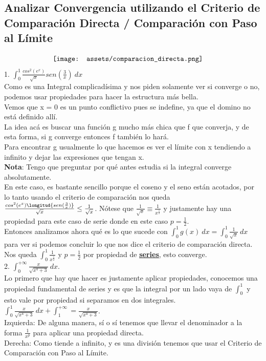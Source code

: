 \documentclass[10pt,a4paper]{article}
\begin{document}
\subsection*{Analizar Convergencia utilizando el Criterio de Comparación Directa / Comparación con Paso al Límite}
\[\begin{minipage}[b]{0.65\textwidth}
    \texttt{[image: assets/comparacion\_directa.png]}
\end{minipage}\]
1. $\int^{1}_{0} \frac{cos^{2}(e^{x})}{\sqrt{x}} sen(\frac{3}{x}) \ dx$ \\
Como es una Integral complicadísima y nos piden solamente ver si converge o no, podemos usar propiedades para hacer la estructura más bella. \\
Vemos que x = 0 es un punto conflictivo pues se indefine, ya que el domino no está definido allí. \\
La idea acá es buscar una función g mucho más chica que f que converja, y de esta forma, si g converge entonces f también lo hará. \\
Para encontrar g usualmente lo que hacemos es ver el límite con x tendiendo a infinito y dejar las expresiones que tengan x. \\
\textbf{Nota}: Tengo que preguntar por qué antes estudia si la integral converge absolutamente. \\
En este caso, es bastante sencillo porque el coseno y el seno están acotados, por lo tanto usando el criterio de comparación nos queda $\frac{cos^{2}(e^{x})\longitud{sen(\frac{3}{x})}}{\sqrt{x}} \le \frac{1}{\sqrt{x}}$. Nótese que $\frac{1}{\sqrt{x}} \equiv \frac{1}{x^{\frac{1}{2}}}$ y justamente hay una propiedad para este caso de serie donde en este caso $p = \frac{1}{2}$. \\
Entonces analizamos ahora qué es lo que sucede con $\int^{1}_{0} g(x) \ dx = \int^{1}_{0} \frac{1}{\sqrt{x}} \ dx$ para ver si podemos concluir lo que nos dice el criterio de comparación directa. \\
Nos queda $\int^{1}_{0} \frac{1}{x^{\frac{1}{2}}}$ y $p = \frac{1}{2}$ por propiedad de \hyperref[subsubsection:series_convergencia]{\textbf{\underline{series}}}, esto converge.  \\
2. $\int^{+ \infty}_{0} \frac{x}{\sqrt{x^{4}+3}} \ dx $. \\
Lo primero que hay que hacer es justamente aplicar propiedades, conocemos una propiedad fundamental de series y es que la integral por un lado vaya de $\int^{1}_{0}$ y esto vale por propiedad si separamos en dos integrales. \\
$\int^{1}_{0} \frac{x}{\sqrt{x^{4}+3}} \ dx + \int^{+\infty}_{1} = \frac{x}{\sqrt{x^{4}+3}}$. \\
Izquierda: De alguna manera, sí o sí tenemos que llevar el denominador a la forma $\frac{1}{x^{p}}$ para aplicar una propiedad directa. \\
Derecha: Como tiende a infinito, y es una división tenemos que usar el Criterio de Comparación con Paso al Límite. \\
\end{document}
